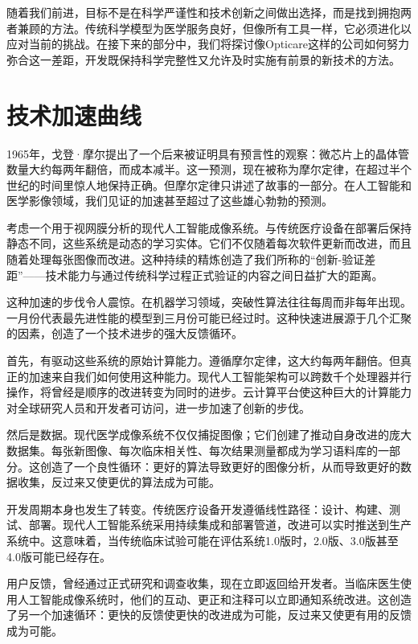 \documentclass[
  Letterpaper,
]{scrbook}
\begin{document}
随着我们前进，目标不是在科学严谨性和技术创新之间做出选择，而是找到拥抱两者兼顾的方法。传统科学模型为医学服务良好，但像所有工具一样，它必须进化以应对当前的挑战。在接下来的部分中，我们将探讨像Opticare这样的公司如何努力弥合这一差距，开发既保持科学完整性又允许及时实施有前景的新技术的方法。

\section{技术加速曲线}\label{ux6280ux672fux52a0ux901fux66f2ux7ebf}

1965年，戈登·摩尔提出了一个后来被证明具有预言性的观察：微芯片上的晶体管数量大约每两年翻倍，而成本减半。这一预测，现在被称为摩尔定律，在超过半个世纪的时间里惊人地保持正确。但摩尔定律只讲述了故事的一部分。在人工智能和医学影像领域，我们见证的加速甚至超过了这些雄心勃勃的预测。

考虑一个用于视网膜分析的现代人工智能成像系统。与传统医疗设备在部署后保持静态不同，这些系统是动态的学习实体。它们不仅随着每次软件更新而改进，而且随着处理每张图像而改进。这种持续的精炼创造了我们所称的``创新-验证差距''------技术能力与通过传统科学过程正式验证的内容之间日益扩大的距离。

这种加速的步伐令人震惊。在机器学习领域，突破性算法往往每周而非每年出现。一月份代表最先进性能的模型到三月份可能已经过时。这种快速进展源于几个汇聚的因素，创造了一个技术进步的强大反馈循环。

首先，有驱动这些系统的原始计算能力。遵循摩尔定律，这大约每两年翻倍。但真正的加速来自我们如何使用这种能力。现代人工智能架构可以跨数千个处理器并行操作，将曾经是顺序的改进转变为同时的进步。云计算平台使这种巨大的计算能力对全球研究人员和开发者可访问，进一步加速了创新的步伐。

然后是数据。现代医学成像系统不仅仅捕捉图像；它们创建了推动自身改进的庞大数据集。每张新图像、每次临床相关性、每次结果测量都成为学习语料库的一部分。这创造了一个良性循环：更好的算法导致更好的图像分析，从而导致更好的数据收集，反过来又使更优的算法成为可能。

开发周期本身也发生了转变。传统医疗设备开发遵循线性路径：设计、构建、测试、部署。现代人工智能系统采用持续集成和部署管道，改进可以实时推送到生产系统中。这意味着，当传统临床试验可能在评估系统1.0版时，2.0版、3.0版甚至4.0版可能已经存在。

用户反馈，曾经通过正式研究和调查收集，现在立即返回给开发者。当临床医生使用人工智能成像系统时，他们的互动、更正和注释可以立即通知系统改进。这创造了另一个加速循环：更快的反馈使更快的改进成为可能，反过来又使更有用的反馈成为可能。
\end{document}
